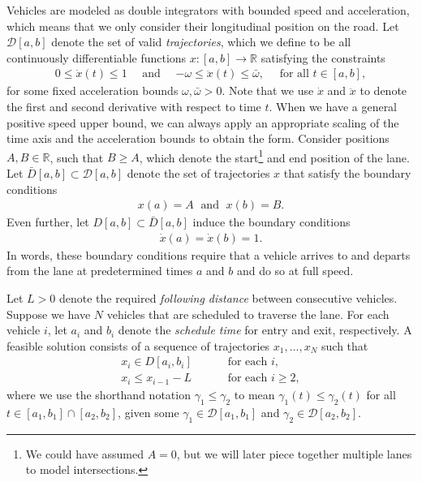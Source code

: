 \documentclass[a4paper]{article}
\theoremstyle{definition}
\theoremstyle{plain}
\begin{document}
Vehicles are modeled as double integrators with bounded speed and acceleration,
which means that we only consider their longitudinal position on the road. Let
$\mathcal{D}[a,b]$ denote the set of valid \emph{trajectories}, which we define to be
all continuously differentiable functions $x : [a,b] \rightarrow \mathbb{R}$ satisfying
the constraints
\begin{align}
  0 \leq \dot{x}(t) \leq 1 \quad \text{ and } \quad
  {-\omega} \leq \ddot{x}(t) \leq \bar{\omega} , \quad \text{ for all } t \in [a,b] ,
\end{align}
for some fixed acceleration bounds $\omega, \bar{\omega} > 0$. Note that we use $\dot{x}$
and $\ddot{x}$ to denote the first and second derivative with respect to time
$t$. When we have a general positive speed upper bound, we can always apply an
appropriate scaling of the time axis and the acceleration bounds to obtain the
form.
%
Consider positions $A, B \in \mathbb{R}$, such that $B \geq A$, which denote the
start\footnote{We could have assumed $A=0$, but we will later piece together
  multiple lanes to model intersections.} and end position of the lane.
%
Let $\bar{D}[a, b] \subset \mathcal{D}[a, b]$ denote the set of trajectories $x$ that
satisfy the boundary conditions
\begin{align}
  x(a) = A \; \text{ and } \; x(b) = B .
\end{align}
Even further, let $D[a,b] \subset \bar{D}[a, b]$ induce the boundary conditions
\begin{align}
  \dot{x}(a) = \dot{x}(b) = 1 .
\end{align}
In words, these boundary conditions require that a vehicle arrives to and
departs from the lane at predetermined times $a$ and $b$ and do so at full
speed.

Let $L > 0$ denote the required \textit{following distance} between consecutive
vehicles.
%
Suppose we have $N$ vehicles that are scheduled to traverse the lane. For each
vehicle $i$, let $a_{i}$ and $b_{i}$ denote the \textit{schedule time} for entry
and exit, respectively. A feasible solution consists of a sequence of
trajectories $x_{1}, \dots, x_{N}$ such that
\begin{subequations}\label{eq:feasibility}
\begin{align}
x_{i} \in D[a_{i}, b_{i}] \quad \quad & \text{ for each } i, \\
x_{i} \leq x_{i-1} - L \quad \quad &\text{ for each } i \geq 2,
\end{align}
\end{subequations}
%
where we use the shorthand notation $\gamma_{1} \leq \gamma_{2}$ to mean
$\gamma_{1}(t) \leq \gamma_{2}(t)$ for all
$t \in [a_{1}, b_{1}] \cap [a_{2}, b_{2}]$, given some
$\gamma_{1} \in \mathcal{D}[a_{1}, b_{1}]$ and
$\gamma_{2} \in \mathcal{D}[a_{2}, b_{2}]$.
\end{document}

